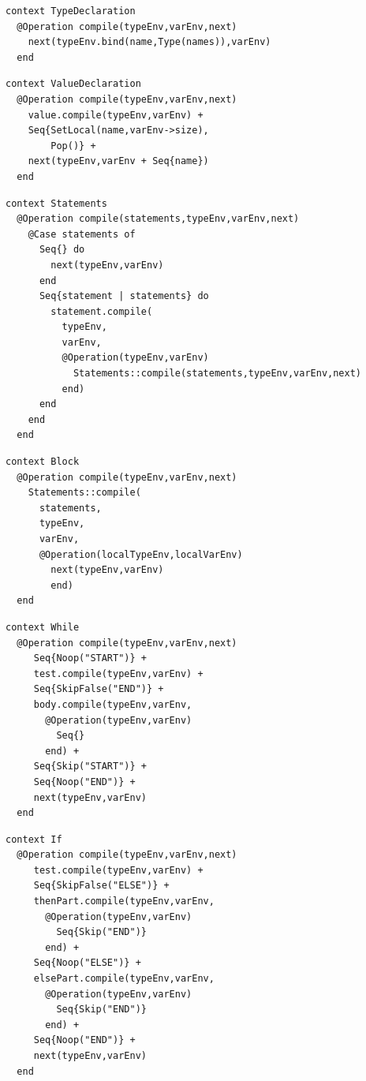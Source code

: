 \documentclass{article}
\begin{document}
\begin{verbatim}
context TypeDeclaration
  @Operation compile(typeEnv,varEnv,next)
    next(typeEnv.bind(name,Type(names)),varEnv)
  end
\end{verbatim}

\begin{verbatim}
context ValueDeclaration
  @Operation compile(typeEnv,varEnv,next)
    value.compile(typeEnv,varEnv) +
    Seq{SetLocal(name,varEnv->size),
        Pop()} +
    next(typeEnv,varEnv + Seq{name})
  end
\end{verbatim}

\begin{verbatim}
context Statements
  @Operation compile(statements,typeEnv,varEnv,next)
    @Case statements of
      Seq{} do 
        next(typeEnv,varEnv) 
      end
      Seq{statement | statements} do 
        statement.compile(
          typeEnv,
          varEnv,
          @Operation(typeEnv,varEnv)
            Statements::compile(statements,typeEnv,varEnv,next)
          end) 
      end
    end
  end
\end{verbatim}

\begin{verbatim}
context Block
  @Operation compile(typeEnv,varEnv,next)
    Statements::compile(
      statements,
      typeEnv,
      varEnv,
      @Operation(localTypeEnv,localVarEnv) 
        next(typeEnv,varEnv) 
        end)
  end
\end{verbatim}

\begin{verbatim}
context While
  @Operation compile(typeEnv,varEnv,next)
     Seq{Noop("START")} +
     test.compile(typeEnv,varEnv) +
     Seq{SkipFalse("END")} +
     body.compile(typeEnv,varEnv,
       @Operation(typeEnv,varEnv) 
         Seq{} 
       end) +
     Seq{Skip("START")} +
     Seq{Noop("END")} +
     next(typeEnv,varEnv)
  end
\end{verbatim}

\begin{verbatim}
context If
  @Operation compile(typeEnv,varEnv,next)
     test.compile(typeEnv,varEnv) +
     Seq{SkipFalse("ELSE")} +
     thenPart.compile(typeEnv,varEnv,
       @Operation(typeEnv,varEnv) 
         Seq{Skip("END")} 
       end) +
     Seq{Noop("ELSE")} +
     elsePart.compile(typeEnv,varEnv,
       @Operation(typeEnv,varEnv) 
         Seq{Skip("END")} 
       end) +
     Seq{Noop("END")} +
     next(typeEnv,varEnv)
  end
\end{verbatim}
\end{document}
